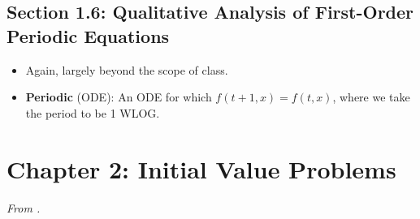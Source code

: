 \documentclass[../notes.tex]{subfiles}
\begin{document}
\subsection*{Section 1.6: Qualitative Analysis of First-Order Periodic Equations}
\begin{itemize}
    \item Again, largely beyond the scope of class.
    \item \textbf{Periodic} (ODE): An ODE for which $f(t+1,x)=f(t,x)$, where we take the period to be 1 WLOG.
\end{itemize}



\section{Chapter 2: Initial Value Problems}
\emph{From \textcite{bib:Teschl}.}
\end{document}
